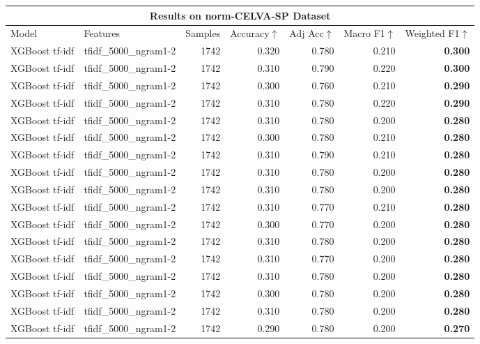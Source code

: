 \begin{table*}[t]
\centering
\small
\setlength{\tabcolsep}{4.5pt}
\renewcommand{\arraystretch}{1}
\begin{tabular}{l l r r r r r}
\multicolumn{7}{c}{Results on norm-CELVA-SP Dataset} \\
\hline
Model & Features & Samples & Accuracy$\uparrow$ & Adj Acc$\uparrow$ & Macro F1$\uparrow$ & Weighted F1$\uparrow$ \\
\hline
XGBoost tf-idf & tfidf_5000_ngram1-2 & 1742 & 0.320 & 0.780 & 0.210 & \textbf{0.300} \\
XGBoost tf-idf & tfidf_5000_ngram1-2 & 1742 & 0.310 & 0.790 & 0.220 & \textbf{0.300} \\
XGBoost tf-idf & tfidf_5000_ngram1-2 & 1742 & 0.300 & 0.760 & 0.210 & \textbf{0.290} \\
XGBoost tf-idf & tfidf_5000_ngram1-2 & 1742 & 0.310 & 0.780 & 0.220 & \textbf{0.290} \\
XGBoost tf-idf & tfidf_5000_ngram1-2 & 1742 & 0.310 & 0.780 & 0.200 & \textbf{0.280} \\
XGBoost tf-idf & tfidf_5000_ngram1-2 & 1742 & 0.300 & 0.780 & 0.210 & \textbf{0.280} \\
XGBoost tf-idf & tfidf_5000_ngram1-2 & 1742 & 0.310 & 0.790 & 0.210 & \textbf{0.280} \\
XGBoost tf-idf & tfidf_5000_ngram1-2 & 1742 & 0.310 & 0.780 & 0.200 & \textbf{0.280} \\
XGBoost tf-idf & tfidf_5000_ngram1-2 & 1742 & 0.310 & 0.780 & 0.200 & \textbf{0.280} \\
XGBoost tf-idf & tfidf_5000_ngram1-2 & 1742 & 0.310 & 0.770 & 0.210 & \textbf{0.280} \\
XGBoost tf-idf & tfidf_5000_ngram1-2 & 1742 & 0.300 & 0.770 & 0.200 & \textbf{0.280} \\
XGBoost tf-idf & tfidf_5000_ngram1-2 & 1742 & 0.310 & 0.780 & 0.200 & \textbf{0.280} \\
XGBoost tf-idf & tfidf_5000_ngram1-2 & 1742 & 0.310 & 0.770 & 0.200 & \textbf{0.280} \\
XGBoost tf-idf & tfidf_5000_ngram1-2 & 1742 & 0.310 & 0.780 & 0.200 & \textbf{0.280} \\
XGBoost tf-idf & tfidf_5000_ngram1-2 & 1742 & 0.300 & 0.780 & 0.200 & \textbf{0.280} \\
XGBoost tf-idf & tfidf_5000_ngram1-2 & 1742 & 0.310 & 0.780 & 0.200 & \textbf{0.280} \\
XGBoost tf-idf & tfidf_5000_ngram1-2 & 1742 & 0.290 & 0.780 & 0.200 & \textbf{0.270} \\

\end{tabular}
\end{table*}
